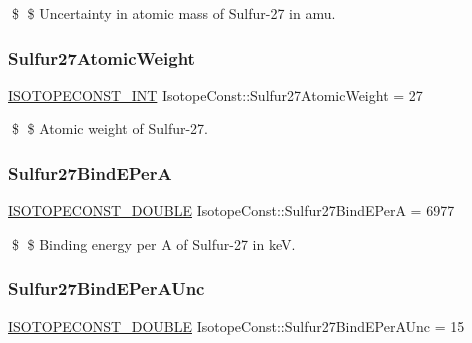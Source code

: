 \$ \$ Uncertainty in atomic mass of Sulfur-\/27 in amu. \mbox{\label{group___isotope_const-_sulfur-_s27_ga0b0acc6d35771ceeb55f474e2c97a890}} 
\subsubsection{\texorpdfstring{Sulfur27\+Atomic\+Weight}{Sulfur27AtomicWeight}}
{\footnotesize\ttfamily \mbox{\hyperlink{group___isotope_const-_macros_ga5f18360b3e99483a35c32d789e62621c}{I\+S\+O\+T\+O\+P\+E\+C\+O\+N\+S\+T\+\_\+\+I\+NT}} Isotope\+Const\+::\+Sulfur27\+Atomic\+Weight = 27}

\$ \$ Atomic weight of Sulfur-\/27. \mbox{\label{group___isotope_const-_sulfur-_s27_ga317913cd2a74629939d7fd96d4c0bb93}} 
\subsubsection{\texorpdfstring{Sulfur27\+Bind\+E\+PerA}{Sulfur27BindEPerA}}
{\footnotesize\ttfamily \mbox{\hyperlink{group___isotope_const-_macros_ga8f45a7272ce02c0b4c65c44636ed719a}{I\+S\+O\+T\+O\+P\+E\+C\+O\+N\+S\+T\+\_\+\+D\+O\+U\+B\+LE}} Isotope\+Const\+::\+Sulfur27\+Bind\+E\+PerA = 6977}

\$ \$ Binding energy per A of Sulfur-\/27 in keV. \mbox{\label{group___isotope_const-_sulfur-_s27_ga333640c6b5ca1fc95d34a7f651795685}} 
\subsubsection{\texorpdfstring{Sulfur27\+Bind\+E\+Per\+A\+Unc}{Sulfur27BindEPerAUnc}}
{\footnotesize\ttfamily \mbox{\hyperlink{group___isotope_const-_macros_ga8f45a7272ce02c0b4c65c44636ed719a}{I\+S\+O\+T\+O\+P\+E\+C\+O\+N\+S\+T\+\_\+\+D\+O\+U\+B\+LE}} Isotope\+Const\+::\+Sulfur27\+Bind\+E\+Per\+A\+Unc = 15}

